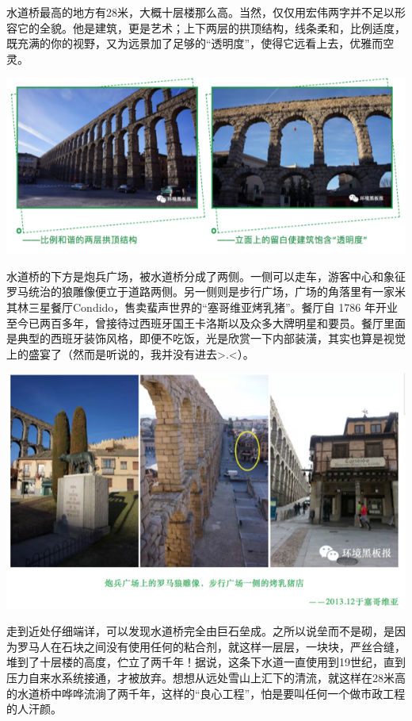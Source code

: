 \documentclass[]{book}
\begin{document}
水道桥最高的地方有28米，大概十层楼那么高。当然，仅仅用宏伟两字并不足以形容它的全貌。他是建筑，更是艺术；上下两层的拱顶结构，线条柔和，比例适度，既充满的你的视野，又为远景加了足够的``透明度''，使得它远看上去，优雅而空灵。

\includegraphics[width=8.33in]{images/xt45}

水道桥的下方是炮兵广场，被水道桥分成了两侧。一侧可以走车，游客中心和象征罗马统治的狼雕像便立于道路两侧。另一侧则是步行广场，广场的角落里有一家米其林三星餐厅Condido，售卖蜚声世界的``塞哥维亚烤乳猪''。餐厅自 1786 年开业至今已两百多年，曾接待过西班牙国王卡洛斯以及众多大牌明星和要员。餐厅里面是典型的西班牙装饰风格，即便不吃饭，光是欣赏一下内部装潢，其实也算是视觉上的盛宴了（然而是听说的，我并没有进去\textgreater{}.\textless{}）。

\includegraphics[width=8.33in]{images/xt46}

走到近处仔细端详，可以发现水道桥完全由巨石垒成。之所以说垒而不是砌，是因为罗马人在石块之间没有使用任何的粘合剂，就这样一层层，一块块，严丝合缝，堆到了十层楼的高度，伫立了两千年！据说，这条下水道一直使用到19世纪，直到压力自来水系统接通，才被放弃。想想从远处雪山上汇下的清流，就这样在28米高的水道桥中哗哗流淌了两千年，这样的``良心工程''，怕是要叫任何一个做市政工程的人汗颜。
\end{document}
